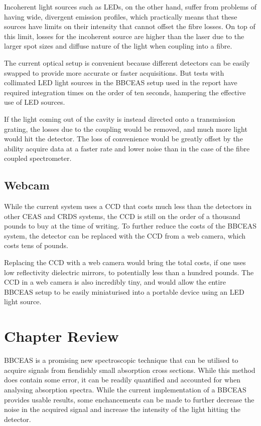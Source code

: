 Incoherent light sources such as \acp{LED}, on the other hand, suffer from
problems of having wide, divergent emission profiles, which practically means
that these sources have limits on their intensity that cannot offset the fibre
losses. On top of this limit, losses for the incoherent source are higher than
the laser due to the larger spot sizes and diffuse nature of the light when
coupling into a fibre.

The current optical setup is convenient because different detectors can be
easily swapped to provide more accurate or faster acquisitions. But tests with
collimated \ac{LED} light sources in the \ac{BBCEAS} setup used in the report
have required integration times on the order of ten seconds, hampering the
effective use of \ac{LED} sources.

If the light coming out of the cavity is instead directed onto a transmission
grating, the losses due to the coupling would be removed, and much more light
would hit the detector. The loss of convenience would be greatly offset by the
ability acquire data at a faster rate and lower noise than in the case of the
fibre coupled spectrometer.



\subsection{Webcam}\label{subsec:bbceas_webcam}

While the current system uses a \ac{CCD} that costs much less than the
detectors in other \ac{CEAS} and \ac{CRDS} systems, the \ac{CCD} is still on
the order of a thousand pounds to buy at the time of writing. To further reduce
the costs of the \ac{BBCEAS} system, the detector can be replaced with the
\ac{CCD} from a web camera, which costs tens of pounds.

Replacing the \ac{CCD} with a web camera would bring the total costs, if one
uses low reflectivity dielectric mirrors, to potentially less than a hundred
pounds. The \ac{CCD} in a web camera is also incredibly tiny, and would allow
the entire \ac{BBCEAS} setup to be easily miniaturised into a portable device
using an \ac{LED} light source.


\section*{Chapter Review}

\ac{BBCEAS} is a promising new spectroscopic technique that can be utilised to
acquire signals from fiendishly small absorption cross sections. While this
method does contain some error, it can be readily quantified and accounted for
when analysing absorption spectra. While the current implementation of a
\ac{BBCEAS} provides usable results, some enchancements can be made to further
decrease the noise in the acquired signal and increase the intensity of the
light hitting the detector.
